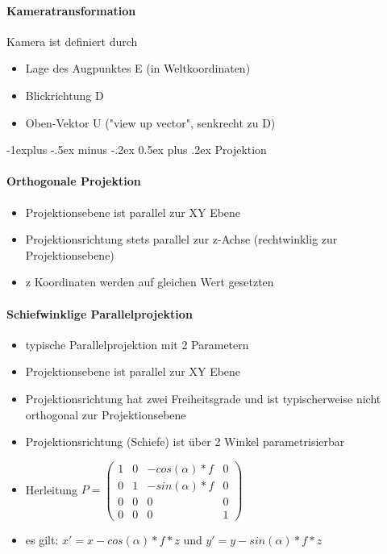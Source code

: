 \documentclass[10pt,landscape]{article}
\makeatletter
\renewcommand{\subsection}{\@startsection{subsection}{2}{0mm}%
                                {-1explus -.5ex minus -.2ex}%
                                {0.5ex plus .2ex}%
                                {\normalfont\normalsize\bfseries}}
\makeatother
\begin{document}
\begin{multicols}{3}
\paragraph{Kameratransformation}
Kamera ist definiert durch
\begin{itemize}
  \item Lage des Augpunktes E (in Weltkoordinaten)
  \item Blickrichtung D
  \item Oben-Vektor U ("view up vector", senkrecht zu D)
\end{itemize}

\subsection{Projektion}
\paragraph{Orthogonale Projektion}
\begin{itemize}
  \item Projektionsebene ist parallel zur XY Ebene
  \item Projektionsrichtung stets parallel zur z-Achse (rechtwinklig zur Projektionsebene)
  \item z Koordinaten werden auf gleichen Wert gesetzten
\end{itemize}

\paragraph{Schiefwinklige Parallelprojektion}
\begin{itemize}
  \item typische Parallelprojektion mit 2 Parametern
  \item Projektionsebene ist parallel zur XY Ebene
  \item Projektionsrichtung hat zwei Freiheitsgrade und ist typischerweise nicht orthogonal zur Projektionsebene
  \item Projektionsrichtung (Schiefe) ist über 2 Winkel parametrisierbar
  \item Herleitung $P=\begin{pmatrix}
        1 & 0 & -cos(\alpha)*f & 0 \\
        0 & 1 & -sin(\alpha)*f & 0 \\
        0 & 0 & 0 & 0 \\
        0 & 0 & 0 & 1 
      \end{pmatrix}$
  \item es gilt: $x'=x-cos(\alpha)*f*z$ und $y'=y-sin(\alpha)*f*z$
\end{itemize}


\end{multicols}
\end{document}
